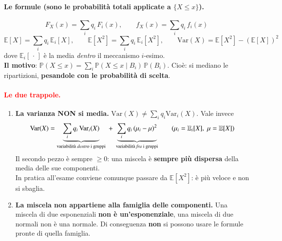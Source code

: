 \documentclass[12pt]{extarticle} %
\begin{document}
\paragraph{Le formule (sono le probabilità totali applicate a $\{X \le x\}$).}
$$ \boxed{\;F_X(x) = \sum_i q_i\, F_i(x), \qquad f_X(x) = \sum_i q_i\, f_i(x)\;} $$
$$ \mathbb{E}[X] = \sum_i q_i\, \mathbb{E}_i[X], \qquad \mathbb{E}[X^2] = \sum_i q_i\, \mathbb{E}_i[X^2], \qquad \mathrm{Var}(X) = \mathbb{E}[X^2] - (\mathbb{E}[X])^2 $$
dove $\mathbb{E}_i[\,\cdot\,]$ è la media \emph{dentro} il meccanismo $i$-esimo. \\
{\footnotesize \textbf{Il motivo}: $\mathbb{P}(X \le x) = \sum_i \mathbb{P}(X \le x \mid B_i)\,\mathbb{P}(B_i)$. Cioè: si mediano le ripartizioni, \textbf{pesandole con le probabilità di scelta}.}

\paragraph{\textcolor{red}{Le due trappole.}}
\begin{enumerate}
    \item \textbf{La varianza NON si media.} $\mathrm{Var}(X) \ne \sum_i q_i \mathrm{Var}_i(X)$. Vale invece
    $$ \mathrm{Var}(X) = \underbrace{\sum_i q_i\, \mathrm{Var}_i(X)}_{\text{variabilità \emph{dentro} i gruppi}} \;+\; \underbrace{\sum_i q_i\, (\mu_i - \mu)^2}_{\text{variabilità \emph{fra} i gruppi}} \qquad (\mu_i = \mathbb{E}_i[X],\; \mu = \mathbb{E}[X]) $$
    Il secondo pezzo è sempre $\ge 0$: una miscela è \textbf{sempre più dispersa} della media delle sue componenti. \\ {\footnotesize In pratica all'esame conviene comunque passare da $\mathbb{E}[X^2]$: è più veloce e non si sbaglia.}
    \item \textbf{La miscela non appartiene alla famiglia delle componenti.} Una miscela di due esponenziali \textbf{non è un'esponenziale}, una miscela di due normali non è una normale. Di conseguenza \textbf{non} si possono usare le formule pronte di quella famiglia.
\end{enumerate}
\end{document}
